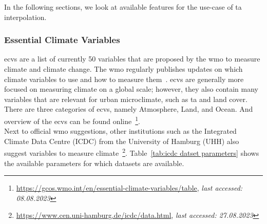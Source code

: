 In the following sections, we look at available features for the use-case of \gls{ta} interpolation.

\subsubsection{Essential Climate Variables}

\gls{ecv}s are a list of currently 50 variables that are proposed by the \gls{wmo} to measure climate and climate change. The \gls{wmo} regularly publishes updates on which climate variables to use and how to measure them~\cite{wmo2018guide}. \gls{ecv}s are generally more focused on measuring climate on a global scale; however, they also contain many variables that are relevant for urban microclimate, such as \gls{ta} and land cover. There are three categories of \gls{ecv}s, namely Atmosphere, Land, and Ocean. And overview of the \gls{ecv}s can be found online~\footnote{\url{https://gcos.wmo.int/en/essential-climate-variables/table}, \textit{last accessed: 08.08.2023}}.\\
Next to official \gls{wmo} suggestions, other institutions such as the Integrated Climate Data Centre (ICDC) from the University of Hamburg (UHH) also suggest variables to measure climate~\footnote{\url{https://www.cen.uni-hamburg.de/icdc/data.html}, \textit{last accessed: 27.08.2023}}. Table~\ref{tab:icdc datset parameters} shows the available parameters for which datasets are available.

